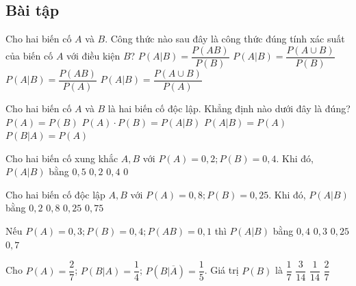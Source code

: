 \subsection{Bài tập}
\begin{ex}%
    Cho hai biến cố $A$ và $B$. Công thức nào sau đây là công thức đúng tính xác suất của biến cố $A$ với điều kiện $B$?
    \choice
    {\True $P(A|B) = \dfrac{P(AB)}{P(B)}$}
    {$P(A|B) = \dfrac{P(A \cup B)}{P(B)}$}
    {$P(A|B) = \dfrac{P(AB)}{P(A)}$}
    {$P(A|B) = \dfrac{P(A \cup B)}{P(A)}$}
\end{ex}
\begin{ex}%
    Cho hai biến cố $A$ và $B$ là hai biến cố độc lập. Khẳng định nào dưới đây là đúng?
    \choice
    {$P(A) = P(B)$}
    {$P(A) \cdot P(B) = P(A|B)$}
    {\True $P(A|B) = P(A)$}
    {$P(B|A) = P(A)$}
\end{ex}
\begin{ex}%
    Cho hai biến cố xung khắc $A, B$ với $P(A) = 0,2; P(B) = 0,4$. Khi đó, $P(A|B)$ bằng
    \choice
    {$0,5$}
    {$0,2$}
    {$0,4$}
    {\True $0$}
\end{ex}
\begin{ex}%
    Cho hai biến cố độc lập $A, B$ với $P(A) = 0,8; P(B) = 0,25$. Khi đó, $P(A|B)$ bằng
    \choice
    {$0,2$}
    {\True $0,8$}
    {$0,25$}
    {$0,75$}
\end{ex}
\begin{ex}%
    Nếu $P(A) = 0,3; P(B) = 0,4; P(AB) = 0,1$ thì $P(A|B)$ bằng
    \choice
    {$0,4$}
    {$0,3$}
    {\True $0,25$}
    {$0,7$}
\end{ex}
\begin{ex}%
    Cho $P(A) = \dfrac{2}{7}$; $P(B|A) = \dfrac{1}{4}$; $P(B|\overline{A}) = \dfrac{1}{5}$. Giá trị $P(B)$ là
    \choice
    {$\dfrac{1}{7}$}
    {\True $\dfrac{3}{14}$}
    {$\dfrac{1}{14}$}
    {$\dfrac{2}{7}$}
\end{ex}
